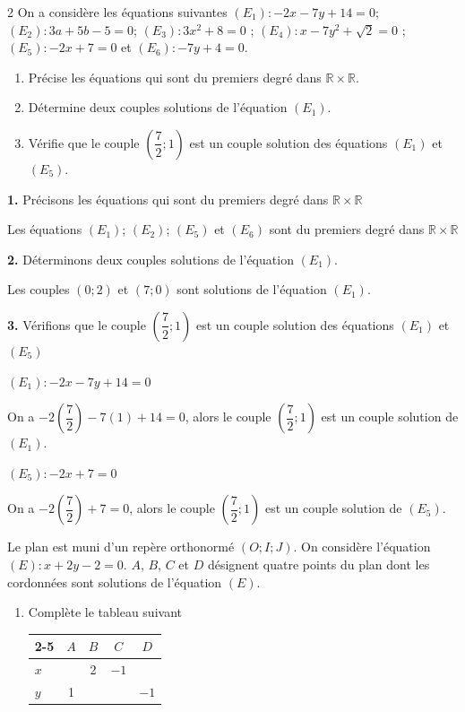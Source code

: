 \begin{multicols*}{2}
  	On a considère les équations suivantes  $(E_{1}): -2x-7y+14=0 $; $(E_{2}): 3a+5b-5=0 $; 
  	$(E_{3}): 3x^2+8=0 $ ; $(E_{4}): x-7y^2+\sqrt{2}=0 $ ; $(E_{5}):-2x+7=0 $ et $(E_{6}): -7y+4=0 $.
  	\begin{enumerate}
  		\item Précise les équations qui sont du premiers degré dans $\mathbb{R}\times \mathbb{R}$.
  		\item Détermine deux couples solutions de l'équation $(E_{1})$.	
  		\item Vérifie que le couple $\left(\dfrac{7}{2};1\right)$ est un couple solution des équations  $(E_{1})$ et $(E_{5})$.
  	\end{enumerate}
  	\dure
  	\resul
  	\textbf{1.} Précisons les équations qui sont du premiers degré dans $\mathbb{R}\times \mathbb{R}$
  	
  	Les équations $(E_{1})$; $(E_{2})$; $(E_{5})$ et $(E_{6})$ sont du premiers degré dans $\mathbb{R}\times \mathbb{R}$
  	
  	\textbf{2.}  Déterminons deux couples solutions de l'équation $(E_{1})$.
  	
  	Les  couples $(0;2)$ et $(7;0)$	sont solutions de l'équation $(E_{1})$.
  	
  	\textbf{3.} Vérifions que le couple $\left(\dfrac{7}{2};1\right)$ est un couple solution des équations  $(E_{1})$ et $(E_{5})$
  	
  	 $(E_{1}): -2x-7y+14=0 $
  	
  	On a $-2\left(\dfrac{7}{2}\right)-7(1)+14=0$, alors le couple $\left(\dfrac{7}{2};1\right)$ est un couple solution de  $(E_{1})$.
  	
  	 $(E_{5}):-2x+7=0 $ 
  	
  	On a $-2\left(\dfrac{7}{2}\right)+7=0$, alors le couple $\left(\dfrac{7}{2};1\right)$ est un couple solution de  $(E_{5})$.
  	
  	
  	Le plan est muni d'un repère orthonormé $\left(O; I;J\right)$. On considère l'équation $(E): x+2y-2= 0 $. $A$, $B$, $C$ et $D$ désignent quatre points du plan dont les cordonnées sont solutions de l'équation $(E)$.
  	
  	\begin{enumerate}
  		\item Complète le tableau suivant
  		
  		\begin{tabular}{|l|c|c|c|c|}
  			\cline{2-5}
  			\multicolumn{1}{c|}{} & $A$ & $B$&$C$&$D$ \\
  			\hline
  			$x$ &  & 2&$-1$&\\ 
  			\hline
  			$y$ & 1 & &&$-1$\\
  			\hline 
  		\end{tabular}	
  		

\end{enumerate}
\end{multicols*}
